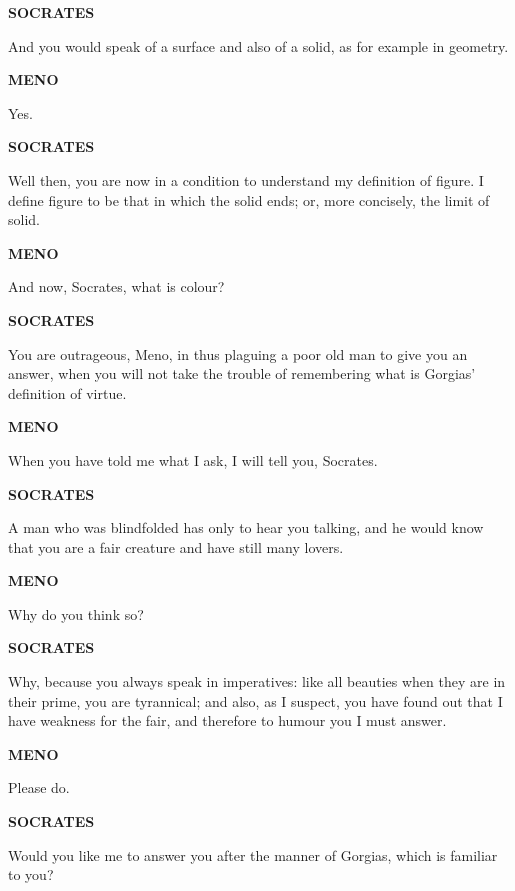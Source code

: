 \documentclass[11pt,letter]{article}
\begin{document}
\par \textbf{SOCRATES}
\par   And you would speak of a surface and also of a solid, as for example in geometry.

\par \textbf{MENO}
\par   Yes.

\par \textbf{SOCRATES}
\par   Well then, you are now in a condition to understand my definition of figure. I define figure to be that in which the solid ends; or, more concisely, the limit of solid.

\par \textbf{MENO}
\par   And now, Socrates, what is colour?

\par \textbf{SOCRATES}
\par   You are outrageous, Meno, in thus plaguing a poor old man to give you an answer, when you will not take the trouble of remembering what is Gorgias' definition of virtue.

\par \textbf{MENO}
\par   When you have told me what I ask, I will tell you, Socrates.

\par \textbf{SOCRATES}
\par   A man who was blindfolded has only to hear you talking, and he would know that you are a fair creature and have still many lovers.

\par \textbf{MENO}
\par   Why do you think so?

\par \textbf{SOCRATES}
\par   Why, because you always speak in imperatives:  like all beauties when they are in their prime, you are tyrannical; and also, as I suspect, you have found out that I have weakness for the fair, and therefore to humour you I must answer.

\par \textbf{MENO}
\par   Please do.

\par \textbf{SOCRATES}
\par   Would you like me to answer you after the manner of Gorgias, which is familiar to you?
\end{document}
